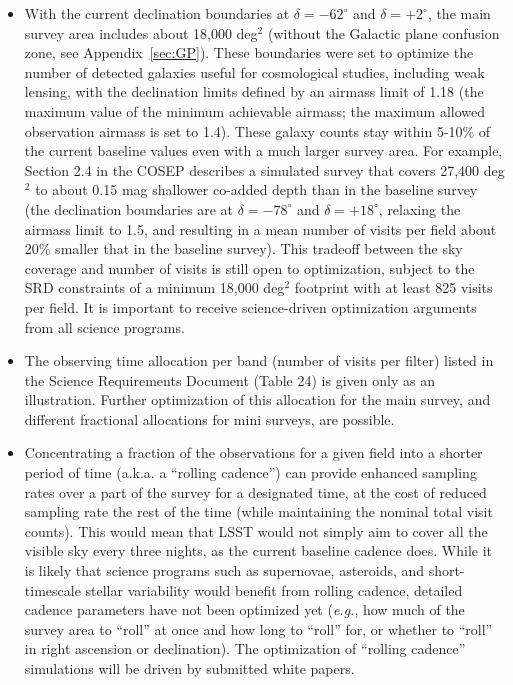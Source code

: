 \documentclass[DM,lsstdraft,toc,usenatbib]{lsstdoc}
\begin{document}
\begin{itemize}
\item With the current declination boundaries at $\delta = -62^\circ$ and $\delta = +2^\circ$,
the main survey area includes about 18,000 deg$^2$ (without the Galactic plane 
confusion zone, see Appendix~\ref{sec:GP}). These boundaries were set to optimize the number of
detected galaxies useful for cosmological studies, including weak lensing, with the declination
limits defined by an airmass limit of 1.18 (the maximum value of the minimum achievable airmass;
the maximum allowed observation airmass is set to 1.4). These galaxy counts 
stay within 5-10\% of the current baseline values even with a much larger survey area. 
For example, Section 2.4 in the COSEP describes a simulated survey
that covers 27,400 deg$^2$ to about 0.15 mag shallower co-added depth than in the baseline 
survey (the declination boundaries are at $\delta = -78^\circ$ and $\delta = +18^\circ$, relaxing the 
airmass limit to 1.5, and resulting in a mean number of visits per field about 20\% smaller that
in the baseline survey). This tradeoff between the sky coverage and number of visits is still
open to optimization, subject to the SRD constraints of a minimum 18,000 deg$^2$ footprint with at least 825 
visits per field. It is important to receive science-driven optimization arguments
from all science programs.  
\item The observing time allocation per band (number of visits per filter) listed in the Science Requirements Document
(Table 24) is given only as an illustration. Further optimization of this allocation for the main 
survey, and different fractional allocations for mini surveys, are possible. 
\item Concentrating a fraction of the observations for a given field into a shorter period of time
(a.k.a. a ``rolling cadence'') can provide enhanced
sampling rates over a part of the survey for a designated time, at the
cost of reduced sampling rate the rest of the time (while maintaining the nominal total 
visit counts). This would mean that LSST would not simply aim to cover all the visible sky every three nights,
as the current baseline cadence does. 
While it is likely that science programs such as supernovae, asteroids, and
short-timescale stellar variability would benefit from rolling cadence, detailed cadence
parameters have not been optimized yet ({\it e.g.}, how much of the survey area to ``roll'' at once 
and how long to ``roll'' for, or whether to ``roll'' in right ascension or declination).
The optimization of ``rolling cadence'' simulations will be driven by submitted white papers. 

\end{itemize}
\end{document}

